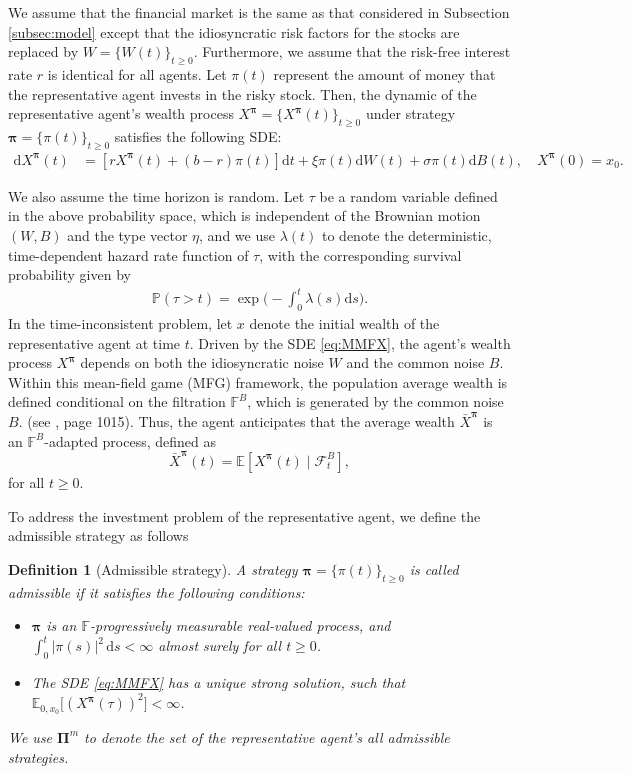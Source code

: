 \documentclass[11pt]{article}
\newtheorem{definition}{Definition}[section]
\newcommand \drm {\mathrm{d}}
\newcommand \E {\mathbb{E}}
\newenvironment{bluepar}
{\begingroup\color{blue}}
{\endgroup}
\numberwithin{equation}{section}
\newcommand{\bpi}{\boldsymbol{\pi}}
\begin{document}
	
	We assume that the financial market is the same as that considered in Subsection \ref{subsec:model} except that the idiosyncratic risk factors for the stocks are replaced by \(W=\{W(t)\}_{t\geq 0}\). Furthermore, we assume that the risk-free interest rate \(r\) is identical for all agents. Let $\pi(t)$ represent the amount of money that the representative agent invests in the risky stock. Then, the dynamic of the representative agent's wealth process $X^{\boldsymbol{\pi}}=\{X^{{\boldsymbol{\pi}}}(t)\}_{t\geq 0}$ under strategy ${\boldsymbol{\pi}} = \{\pi(t)\}_{t \ge 0}$ satisfies the following SDE:
	\begin{align}\label{eq:MMFX}
		\drm X^{\bpi}(t)&= [rX^{\bpi}(t)  +(b-r)\pi(t)]\drm t+\xi\pi(t)\drm W(t)+\sigma\pi(t)\drm B(t),\quad X^{\bpi}(0)=x_0.
	\end{align}
	
	
We also assume the time horizon is random. Let \(\tau\) be a random variable defined in the above probability space, which is independent of the Brownian motion \((W,B)\) and the type vector \(\eta\), and we use \(\lambda(t)\)  to denote the deterministic, time-dependent hazard rate function of \(\tau\), with the corresponding survival probability given by
		\begin{align*}
			\mathbb{P}(\tau>t)=\exp \Big(-\int_0^t \lambda(s)\drm s\Big).
		\end{align*}
\begin{bluepar}
In the time-inconsistent problem, let $x$ denote the initial wealth of the representative agent at time $t$. Driven by the SDE \eqref{eq:MMFX}, the agent's wealth process $X^{\bpi}$ depends on both the idiosyncratic noise $W$ and the common noise $B$.	Within this mean-field game (MFG) framework, the population average wealth is defined conditional on the filtration $\mathbb{F}^B$, which is generated by the common noise $B$. (see \citet{lacker2019mean}, page 1015). Thus, the agent anticipates that the average wealth $\bar{X}^{\bpi}$ is an $\mathbb{F}^B$-adapted process, defined as $$\bar{X}^{\bpi}(t)=\mathbb{E}[X^{\bpi}(t)\mid\mathcal{F}_t^B],$$
 for all $t \ge 0$.
 	\end{bluepar}
 	
 To address the investment problem of the representative agent, we define the admissible strategy as follows
\begin{definition}[Admissible strategy]\label{def:mf_admissible}
A strategy \(\bm{\pi} = \{\pi(t)\}_{t\geq 0}\) is called admissible if it satisfies the following conditions:
\begin{itemize}
\item[$(1)$] $\boldsymbol{\pi}$ is an $\mathbb{F}$-progressively measurable real-valued process, and \( \int_0^t |\pi(s)|^2\, \drm s<\infty\) almost surely for all \( t \geq 0 \).
\item[$(2)$] The SDE \eqref{eq:MMFX} has a unique strong solution, such that
$\E_{0, {x_0 }} \big[\left({X}^{\bpi } (\tau)\right)^2\big]<\infty$.
\end{itemize}
We use \( \boldsymbol{\Pi}^m \) to denote the set of the representative agent's all admissible strategies.
\end{definition}
\end{document}
